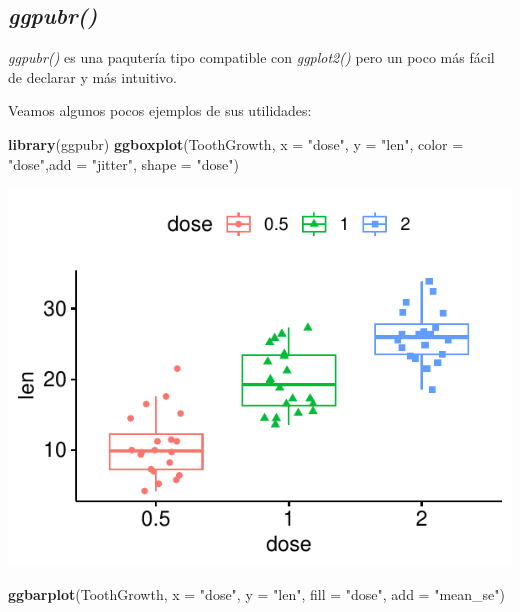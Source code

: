 \documentclass[
]{book}
\newenvironment{Shaded}{\begin{snugshade}}{\end{snugshade}}
\newcommand{\AttributeTok}[1]{\textcolor[rgb]{0.13,0.29,0.53}{#1}}
\newcommand{\FunctionTok}[1]{\textcolor[rgb]{0.13,0.29,0.53}{\textbf{#1}}}
\newcommand{\NormalTok}[1]{#1}
\newcommand{\StringTok}[1]{\textcolor[rgb]{0.31,0.60,0.02}{#1}}
\begin{document}
\subsection{\texorpdfstring{\emph{ggpubr()}}{ggpubr()}}\label{ggpubr}

\emph{ggpubr()} es una paqutería tipo compatible con \emph{ggplot2()} pero un poco más fácil de declarar y más intuitivo.

Veamos algunos pocos ejemplos de sus utilidades:

\begin{Shaded}
\begin{Highlighting}[]
\FunctionTok{library}\NormalTok{(ggpubr)}
\FunctionTok{ggboxplot}\NormalTok{(ToothGrowth, }\AttributeTok{x =} \StringTok{"dose"}\NormalTok{, }\AttributeTok{y =} \StringTok{"len"}\NormalTok{, }\AttributeTok{color =} \StringTok{"dose"}\NormalTok{,}\AttributeTok{add =} \StringTok{"jitter"}\NormalTok{, }\AttributeTok{shape =} \StringTok{"dose"}\NormalTok{)}
\end{Highlighting}
\end{Shaded}

\begin{center}\includegraphics{_main_files/figure-latex/unnamed-chunk-226-1} \end{center}

\begin{Shaded}
\begin{Highlighting}[]
\FunctionTok{ggbarplot}\NormalTok{(ToothGrowth, }\AttributeTok{x =} \StringTok{"dose"}\NormalTok{, }\AttributeTok{y =} \StringTok{"len"}\NormalTok{, }\AttributeTok{fill =} \StringTok{"dose"}\NormalTok{, }\AttributeTok{add =} \StringTok{"mean\_se"}\NormalTok{)}
\end{Highlighting}
\end{Shaded}
\end{document}
